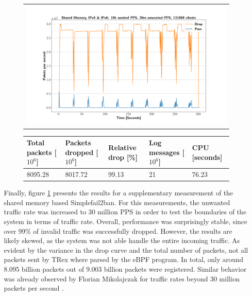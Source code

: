 \pagebreak

\begin{figure}[!h]
	\centering
	\scriptsize
	\begin{tabular}{c}
    	\centerline{\includegraphics[width=1.2\textwidth]{images/simplefail2ban_shm_ipv46_v10k_iv30m_c131068.png}}
	\end{tabular}
	\begin{tabular}{lllll}
		\toprule
		\textbf{Total packets [$10^6$]} & \textbf{Packets dropped [$10^6$]} & \textbf{Relative drop [\%]} & \textbf{Log messages [$10^6$]} & \textbf{CPU [seconds]} \\ \midrule 
		8095.28 & 8017.72 & 99.13 & 21 & 76.23 \\
		\bottomrule
	\end{tabular}
	\caption[Simplefail2ban, Shared Memory, IPv4 \& IPv6, 30m \ac{PPS}]{}
	\label{fig:simplefail2ban:shm:ip46:30m}
\end{figure}

Finally, figure \ref{fig:simplefail2ban:shm:ip46:30m} presents the results for a supplementary measurement of the 
shared memory based Simplefail2ban. For this measurements, the unwanted traffic rate was increased to 30 million \ac{PPS} in order to test the boundaries of the system in terms of traffic rate.  
Overall, performance was surprisingly stable, since over 99\% of invalid traffic was successfully dropped. However, the results are likely skewed, as the system was not able handle
the entire incoming traffic. As evident by the variance in the drop curve and the total number of packets, not all packets sent by TRex where parsed by the \ac{eBPF} program.
In total, only around 8.095 billion  packets out of 9.003 billion packets were registered. Similar behavior was already observed by Florian Mikolajczak for traffic rates beyond
30 million packets per second \cite{mikolajczak2022}.

